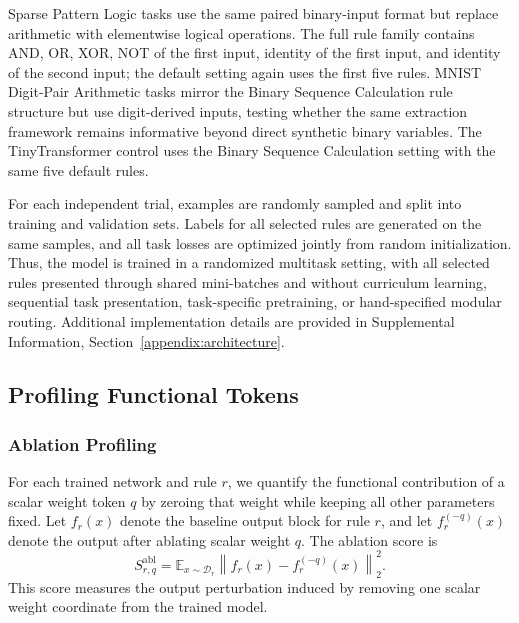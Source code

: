 \documentclass{article}
\begin{document}
Sparse Pattern Logic tasks use the same paired binary-input format but replace arithmetic with elementwise logical operations. The full rule family contains AND, OR, XOR, NOT of the first input, identity of the first input, and identity of the second input; the default setting again uses the first five rules. MNIST Digit-Pair Arithmetic tasks mirror the Binary Sequence Calculation rule structure but use digit-derived inputs, testing whether the same extraction framework remains informative beyond direct synthetic binary variables. The TinyTransformer control uses the Binary Sequence Calculation setting with the same five default rules.

For each independent trial, examples are randomly sampled and split into training and validation sets. Labels for all selected rules are generated on the same samples, and all task losses are optimized jointly from random initialization. Thus, the model is trained in a randomized multitask setting, with all selected rules presented through shared mini-batches and without curriculum learning, sequential task presentation, task-specific pretraining, or hand-specified modular routing. Additional implementation details are provided in Supplemental Information, Section~\ref{appendix:architecture}.

\subsection{Profiling Functional Tokens}

\subsubsection{Ablation Profiling}
For each trained network and rule $r$, we quantify the functional contribution of a scalar weight token $q$ by zeroing that weight while keeping all other parameters fixed. Let $f_r(x)$ denote the baseline output block for rule $r$, and let $f_r^{(-q)}(x)$ denote the output after ablating scalar weight $q$. The ablation score is
\begin{equation}
S^{\mathrm{abl}}_{r,q}
=\mathbb{E}_{x\sim\mathcal{D}_r}
\left\|f_r(x)-f_r^{(-q)}(x)\right\|_2^2 .
\end{equation}
This score measures the output perturbation induced by removing one scalar weight coordinate from the trained model.
\end{document}
